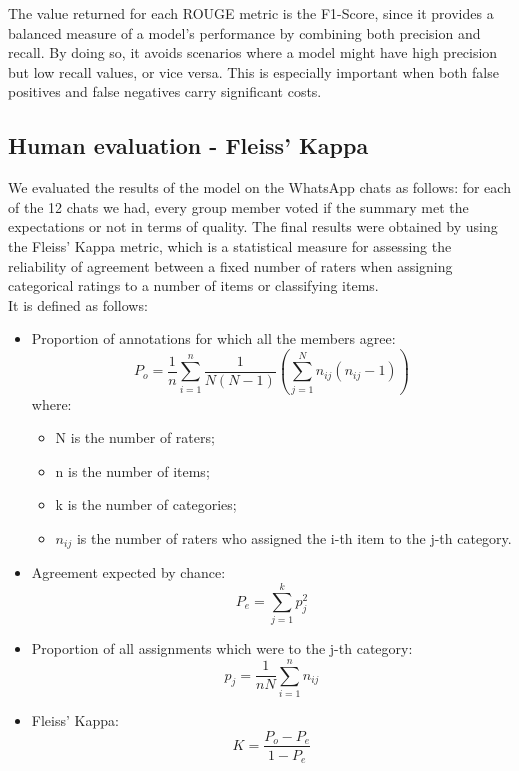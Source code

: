 \documentclass[10pt,twocolumn,letterpaper]{article}
\begin{document}
The value returned for each ROUGE metric is the F1-Score, since it provides a balanced measure of a model's performance by combining both precision and recall. By doing so, it avoids scenarios where a model might have high precision but low recall values, or vice versa. This is especially important when both false positives and false negatives carry significant costs.

\subsection{Human evaluation - Fleiss' Kappa}
We evaluated the results of the model on the WhatsApp chats as follows: for each of the 12 chats we had, every group member voted if the summary met the expectations or not in terms of quality.
The final results were obtained by using the Fleiss' Kappa metric, which is a statistical measure for assessing the reliability of agreement between a fixed number of raters when assigning categorical ratings to a number of items or classifying items. \\
It is defined as follows:
\begin{itemize}
    \item Proportion of annotations for which all the members agree:
    \begin{equation}
        P_o = \frac{1}{n} \sum_{i=1}^n \frac{1}{N(N-1)}(\sum_{j=1}^N n_{ij}(n_{ij} - 1))
    \end{equation}
    where:
    \begin{itemize}
        \item N is the number of raters;
        \item n is the number of items;
        \item k is the number of categories;
        \item $n_{ij}$ is the number of raters who assigned the i-th item to the j-th category.
    \end{itemize}
    \item Agreement expected by chance:
    \begin{equation}
        P_e = \sum_{j=1}^k p_j^2
    \end{equation}
    \item Proportion of all assignments which were to the j-th category:
    \begin{equation}
        p_j = \frac{1}{nN} \sum_{i=1}^n n_{ij}
    \end{equation}
    \item Fleiss' Kappa:
    \begin{equation}
        K = \frac{P_o - P_e}{1 - P_e}
    \end{equation}
\end{itemize}
\end{document}

